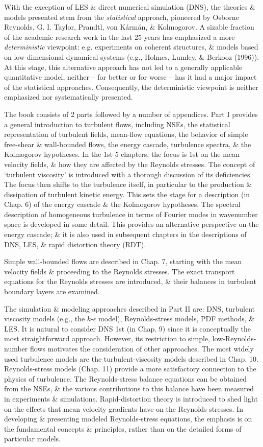 \documentclass[oneside]{book}
\numberwithin{equation}{section}
\begin{document}
With the exception of LES \& direct numerical simulation (DNS), the theories \& models presented stem from the \textit{statistical} approach, pioneered by Osborne Reynolds, G. I. Taylor, Prandtl, von K\'arm\'an, \& Kolmogorov. A sizable fraction of the academic research work in the last 25 years has emphasized a more \textit{deterministic} viewpoint: e.g. experiments on coherent structures, \& models based on low-dimensional dynamical systems (e.g., Holmes, Lumley, \& Berkooz (1996)). At this stage, this alternative approach has not led to a generally applicable quantitative model, neither -- for better or for worse -- has it had a major impact of the statistical approaches. Consequently, the deterministic viewpoint is neither emphasized nor systematically presented.

The book consists of 2 parts followed by a number of appendices. Part I provides a general introduction to turbulent flows, including NSEs, the statistical representation of turbulent fields, mean-flow equations, the behavior of simple free-shear \& wall-bounded flows, the energy cascade, turbulence spectra, \& the Kolmogorov hypotheses. In the 1st 5 chapters, the focus is 1st on the mean velocity fields, \& how they are affected by the Reynolds stresses. The concept of `turbulent viscosity' is introduced with a thorough discussion of its deficiencies. The focus then shifts to the turbulence itself, in particular to the production \& dissipation of turbulent kinetic energy. This sets the stage for a description (in Chap. 6) of the energy cascade \& the Kolmogorov hypotheses. The spectral description of homogeneous turbulence in terms of Fourier modes in wavenumber space is developed in some detail. This provides an alternative perspective on the energy cascade; \& it is also used in subsequent chapters in the descriptions of DNS, LES, \& rapid distortion theory (RDT).

Simple wall-bounded flows are described in Chap. 7, starting with the mean velocity fields \& proceeding to the Reynolds stresses. The exact transport equations for the Reynolds stresses are introduced, \& their balances in  turbulent boundary layers are examined.

The simulation \& modeling approaches described in Part II are: DNS, turbulent viscosity models (e.g., the $k$-$\epsilon$ model), Reynolds-stress models, PDF methods, \& LES. It is natural to consider DNS 1st (in Chap. 9) since it is conceptually the most straightforward approach. However, its restriction to simple, low-Reynolds-number flows motivates the consideration of other approaches. The most widely used turbulence models are the turbulent-viscosity models described in Chap. 10. Reynolds-stress models (Chap. 11) provide a more satisfactory connection to the physics of turbulence. The Reynolds-stress balance equations can be obtained from the NSEs, \& the various contributions to this balance have been measured in experiments \& simulations. Rapid-distortion theory is introduced to shed light on the effects that mean velocity gradients have on the Reynolds stresses. In developing \& presenting modeled Reynolds-stress equations, the emphasis is on the fundamental concepts \& principles, rather than on the detailed forms of particular models.
\end{document}
